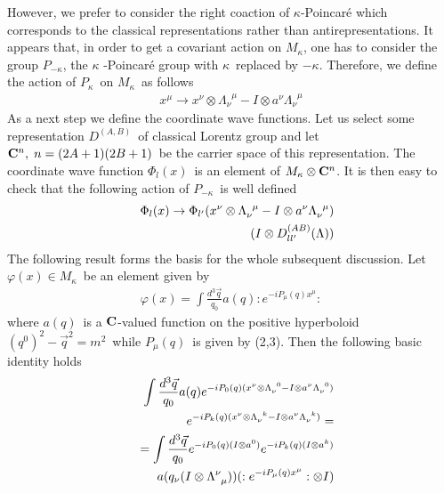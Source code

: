 \documentclass[a4paper,a4paper]{article}
\begin{document}
However, we prefer to consider the right coaction of
$\kappa$-Poincar\'{e} which corresponds to the classical
representations rather than
antirepresentations. It appears that, in order to get a covariant
action on $%
M_{\kappa}$, one has to consider the group $P_{-\kappa}$,  the
$\kappa$%
-Poincar\'{e} group with $\kappa$\ replaced by $-\kappa$.
Therefore, we define the action of $P_{\kappa}$\ on $M_{\kappa}$\
as follows
\begin{eqnarray}\label{wz18}
x^{\mu}\rightarrow x^{\nu}\otimes \Lambda_{\nu}^{\;\;\mu}-I\otimes
a^{\nu}\Lambda_{\nu}^{\;\;\mu}  \label{w11}  %
\end{eqnarray}
As a next step we define the coordinate wave functions. Let us
select some representation $D^{(A,B)}$\ of classical Lorentz
group and let ${\bf C}^{n}, \;n=(2A+1)(2B+1)$\ be the carrier
space of this representation. The
coordinate wave function $\Phi_{l}(x)$\ is an element of $%
M_{\kappa}\otimes {\bf C}^{n}$.  It is then easy to check that the
following action of $P_{-\kappa}$\ is well defined
\renewcommand{\theequation}{\arabic{equation}}
\setcounter{equation}{17}
\begin{eqnarray}\label{wz19}
&&
\Phi_{l}(x)\rightarrow \Phi_{l^{\prime}}(x^{\nu}\otimes
\Lambda_{\nu}^{\;\;\mu}-I\otimes a^{\nu}\Lambda_{\nu}^{\;\;\mu})
\cr
&&
\qquad
(I\otimes
D_{ll^{\prime}}^{(AB)}(\Lambda))
\end{eqnarray}
The following result forms the basis for the whole subsequent
discussion. Let $\varphi (x)\in M_{\kappa}$\ be an element given
by
\begin{eqnarray}\label{wz20}
\varphi (x)= \int \frac{d^{3}\vec{q}}{q_{0}}a(q):e^{-
iP_{\mu}(q)x^{\mu}}:
\end{eqnarray}
where $a(q)$\ is a ${\bf C}$-valued function on the positive
hyperboloid $%
(q^{0})^{2}-\vec{q}^{2}=m^{2}$\ while $P_{\mu}(q)$\ is given by
(2,3).
\newline Then the following basic identity holds
\begin{eqnarray}\label{wz21}
&&\int \frac{d^{3}\vec{q}}{q_{0}}a(q)e^{-iP_{0}(q)(x^{\nu}\otimes
\Lambda_{\nu}^{\;\;0}-I\otimes a^{\nu}
\Lambda_{\nu}^{\;\;0})}
\cr
&&\quad
e^{-iP_{k}(q)(x^{\nu}\otimes \Lambda_{\nu}^{\;\;k}-I\otimes
a^{\nu}\Lambda_{\nu}^{\;\;k})}= \label{w15} \\  %
&&= \int \frac{d^{3}\vec{q}}{q_{0}}e^{-iP_{0}(q)(I\otimes
a^{0})}
e^{-iP_{k}(q)(I\otimes a^{k})}
\cr
&&
\quad
a(q_{\nu}(I\otimes
\Lambda^{\nu}_{\;\;\mu}))
(:e^{-iP_{\mu}(q)x^{\mu}}:\otimes I)  \nonumber
\end{eqnarray}
\end{document}
